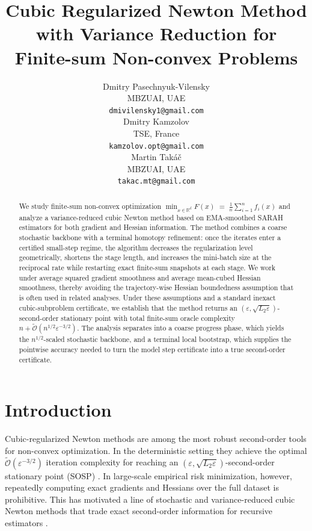 \documentclass{article}
\author{%
  Dmitry Pasechnyuk-Vilensky\\
  MBZUAI, UAE \\
  \texttt{dmivilensky1@gmail.com} \\
  \And
  Dmitry Kamzolov \\
  TSE, France \\
  \texttt{kamzolov.opt@gmail.com} \\
  \And
  Martin Taká\v{c} \\
  MBZUAI, UAE \\
  \texttt{takac.mt@gmail.com}
}
\title{Cubic Regularized Newton Method with Variance Reduction for Finite-sum Non-convex Problems}
\theoremstyle{plain}
\theoremstyle{definition}
\theoremstyle{remark}
\begin{document}
\maketitle


\begin{abstract}
We study finite-sum non-convex optimization
$\min_{x\in\mathbb{R}^d} F(x)
\;=\;
\frac{1}{n}\sum_{i=1}^n f_i(x)$
and analyze a variance-reduced cubic Newton method based on EMA-smoothed SARAH estimators for both gradient and Hessian information. The method combines a coarse stochastic backbone with a terminal homotopy refinement: once the iterates enter a certified small-step regime, the algorithm decreases the regularization level geometrically, shortens the stage length, and increases the mini-batch size at the reciprocal rate while restarting exact finite-sum snapshots at each stage. We work under average squared gradient smoothness and average mean-cubed Hessian smoothness, thereby avoiding the trajectory-wise Hessian boundedness assumption that is often used in related analyses. Under these assumptions and a standard inexact cubic-subproblem certificate, we establish that the method returns an \((\varepsilon,\sqrt{L_2\varepsilon})\)-second-order stationary point with total finite-sum oracle complexity
$n+\widetilde{\mathcal O}\!\left(n^{1/2}\varepsilon^{-3/2}\right)$.
The analysis separates into a coarse progress phase, which yields the \(n^{1/2}\)-scaled stochastic backbone, and a terminal local bootstrap, which supplies the pointwise accuracy needed to turn the model step certificate into a true second-order certificate.
\end{abstract}

\section{Introduction}

Cubic-regularized Newton methods are among the most robust second-order tools for non-convex optimization. In the deterministic setting they achieve the optimal \(\widetilde{\mathcal O}(\varepsilon^{-3/2})\) iteration complexity for reaching an \((\varepsilon,\sqrt{L_2\varepsilon})\)-second-order stationary point (SOSP) \cite{nesterov2006cubic}. In large-scale empirical risk minimization, however, repeatedly computing exact gradients and Hessians over the full dataset is prohibitive. This has motivated a line of stochastic and variance-reduced cubic Newton methods that trade exact second-order information for recursive estimators \cite{wang2019stochastic,zhou2019stochastic,zhou2020stochastic,chayti2023unified}.
\end{document}
